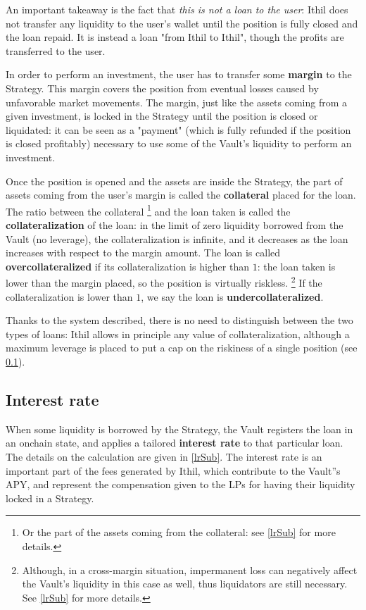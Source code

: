 \documentclass[a4paper,10 pt]{article}
\theoremstyle{definition}
\begin{document}
An important takeaway is the fact that {\it this is not a loan to the user}: Ithil does not transfer any liquidity to the user's wallet until the position is fully closed and the loan repaid. It is instead a loan "from Ithil to Ithil", though the profits are transferred to the user.

In order to perform an investment, the user has to transfer some {\bf margin} to the Strategy. This margin covers the position from eventual losses caused by unfavorable market movements. The margin, just like the assets coming from a given investment, is locked in the Strategy until the position is closed or liquidated: it can be seen as a "payment" (which is fully refunded if the position is closed profitably) necessary to use some of the Vault's liquidity to perform an investment.

Once the position is opened and the assets are inside the Strategy, the part of assets coming from the user's margin is called the {\bf collateral} placed for the loan. The ratio between the collateral \footnote{Or the part of the assets coming from the collateral: see \ref{lrSub} for more details.} and the loan taken is called the {\bf collateralization} of the loan: in the limit of zero liquidity borrowed from the Vault (no leverage), the collateralization is infinite, and it decreases as the loan increases with respect to the margin amount. The loan is called {\bf overcollateralized} if its collateralization is higher than $1$: the loan taken is lower than the margin placed, so the position is virtually riskless. \footnote{Although, in a cross-margin situation, impermanent loss can negatively affect the Vault's liquidity in this case as well, thus liquidators are still necessary. See \ref{lrSub} for more details.} If the collateralization is lower than $1$, we say the loan is {\bf undercollateralized}. 

Thanks to the system described, there is no need to distinguish between the two types of loans: Ithil allows in principle any value of collateralization, although a maximum leverage is placed to put a cap on the riskiness of a single position (see \ref{irSub}).

\subsection{Interest rate}\label{irSub}
When some liquidity is borrowed by the Strategy, the Vault registers the loan in an onchain state, and applies a tailored {\bf interest rate} to that particular loan. The details on the calculation are given in \ref{lrSub}. The interest rate is an important part of the fees generated by Ithil, which contribute to the Vault''s APY, and represent the compensation given to the LPs for having their liquidity locked in a Strategy.
\end{document}
